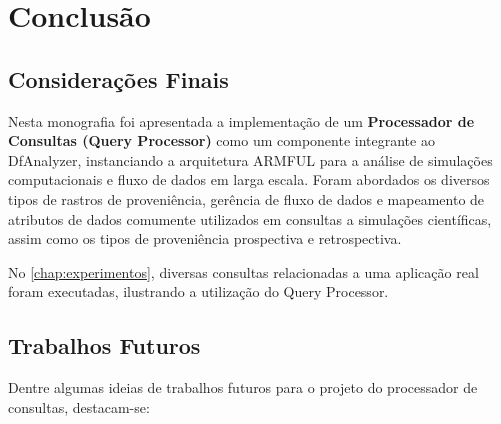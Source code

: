 
\chapter{Conclusão}%
\label{chap:conclusao}

\section{Considerações Finais}

Nesta monografia foi apresentada a implementação de um \textbf{Processador de Consultas (Query Processor)} como um componente integrante ao DfAnalyzer, instanciando a arquitetura ARMFUL para a análise de simulações computacionais e fluxo de dados em larga escala. Foram abordados os diversos tipos de rastros de proveniência, gerência de fluxo de dados e mapeamento de atributos de dados comumente utilizados em consultas a simulações científicas, assim como os tipos de proveniência prospectiva e retrospectiva.

No \autoref{chap:experimentos}, diversas consultas relacionadas a uma aplicação real~\cite{silva2016situ} foram executadas, ilustrando a utilização do Query Processor.


\section{Trabalhos Futuros}

Dentre algumas ideias de trabalhos futuros para o projeto do processador de consultas, destacam-se:

